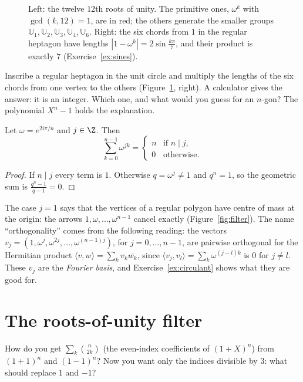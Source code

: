 \begin{figure}[ht]
\centering
{}
\caption{Left: the twelve $12$th roots of unity. The primitive ones, $\omega^k$ with $\gcd(k,12)=1$, are in red; the others generate the smaller groups $\mathbb U_1,\mathbb U_2,\mathbb U_3,\mathbb U_4,\mathbb U_6$. Right: the six chords from $1$ in the regular heptagon have lengths $|1-\omega^k|=2\sin\frac{k\pi}7$, and their product is exactly $7$ (Exercise~\ref{ex:sines}).}
\label{fig:roots}
\end{figure}

\begin{think}
Inscribe a regular heptagon in the unit circle and multiply the lengths of the six chords from one vertex to the others (Figure~\ref{fig:roots}, right). A calculator gives the answer: it is an integer. Which one, and what would you guess for an $n$-gon? The polynomial $X^n-1$ holds the explanation.
\end{think}

\begin{proposition}[orthogonality]\label{prop:orth}
Let $\omega=e^{2i\pi/n}$ and $j\in\Z$. Then
\[
\sum_{k=0}^{n-1}\omega^{jk}=\begin{cases}n&\text{if }n\mid j,\\0&\text{otherwise.}\end{cases}
\]
\end{proposition}
\begin{proof}
If $n\mid j$ every term is $1$. Otherwise $q=\omega^j\ne1$ and $q^n=1$, so the geometric sum is $\frac{q^n-1}{q-1}=0$.
\end{proof}

The case $j=1$ says that the vertices of a regular polygon have centre of mass at the origin: the arrows $1,\omega,\dots,\omega^{n-1}$ cancel exactly
(Figure~\ref{fig:filter}). The name ``orthogonality'' comes from the following reading: the vectors $v_j=(1,\omega^j,\omega^{2j},\dots,\omega^{(n-1)j})$, for
$j=0,\dots,n-1$, are pairwise orthogonal for the Hermitian product $\langle v,w\rangle=\sum_kv_k\overline{w_k}$, since $\langle v_j,v_l\rangle=\sum_k\omega^{(j-l)k}$ is $0$ for $j\ne l$.
These $v_j$ are the \emph{Fourier basis}, and Exercise~\ref{ex:circulant} shows what they are good for.

\section{The roots-of-unity filter}

\begin{think}
How do you get $\sum_k\binom n{2k}$ (the even-index coefficients of $(1+X)^n$) from $(1+1)^n$ and $(1-1)^n$? Now you want only the indices divisible by $3$: what should replace $1$ and $-1$?
\end{think}

